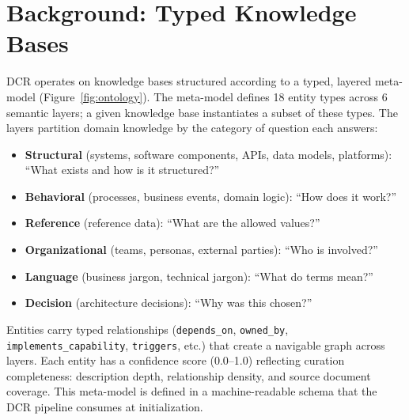 \documentclass[11pt,a4paper]{article}
\begin{document}
\section{Background: Typed Knowledge Bases}
\label{sec:background}

DCR operates on knowledge bases structured according to a typed, layered meta-model (Figure~\ref{fig:ontology}). The meta-model defines 18 entity types across 6 semantic layers; a given knowledge base instantiates a subset of these types. The layers partition domain knowledge by the category of question each answers:

\begin{itemize}[nosep]
  \item \textbf{Structural} (systems, software components, APIs, data models, platforms): ``What exists and how is it structured?''
  \item \textbf{Behavioral} (processes, business events, domain logic): ``How does it work?''
  \item \textbf{Reference} (reference data): ``What are the allowed values?''
  \item \textbf{Organizational} (teams, personas, external parties): ``Who is involved?''
  \item \textbf{Language} (business jargon, technical jargon): ``What do terms mean?''
  \item \textbf{Decision} (architecture decisions): ``Why was this chosen?''
\end{itemize}

Entities carry typed relationships (\texttt{depends\_on}, \texttt{owned\_by}, \texttt{implements\_capability}, \texttt{triggers}, etc.) that create a navigable graph across layers. Each entity has a confidence score (0.0--1.0) reflecting curation completeness: description depth, relationship density, and source document coverage. This meta-model is defined in a machine-readable schema that the DCR pipeline consumes at initialization.
\end{document}
